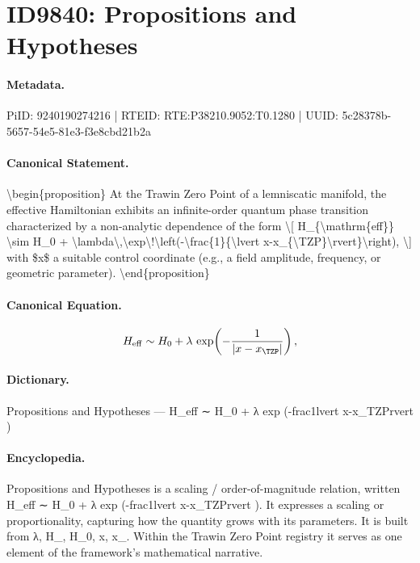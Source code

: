 \section*{ID9840: Propositions and Hypotheses}
\paragraph{Metadata.}
PiID: 9240190274216 | RTEID: RTE:P38210.9052:T0.1280 | UUID: 5c28378b-5657-54e5-81e3-f3e8cbd21b2a

\paragraph{Canonical Statement.}
\textbackslash{}begin\{proposition\} At the Trawin Zero Point of a lemniscatic manifold, the effective Hamiltonian exhibits an infinite-order quantum phase transition characterized by a non-analytic dependence of the form \textbackslash{}[ H\_\{\textbackslash{}mathrm\{eff\}\} \textbackslash{}sim H\_0 + \textbackslash{}lambda\textbackslash{},\textbackslash{}exp\textbackslash{}!\textbackslash{}left(-\textbackslash{}frac\{1\}\{\textbackslash{}lvert x-x\_\{\textbackslash{}TZP\}\textbackslash{}rvert\}\textbackslash{}right), \textbackslash{}] with \$x\$ a suitable control coordinate (e.g., a field amplitude, frequency, or geometric parameter). \textbackslash{}end\{proposition\}

\paragraph{Canonical Equation.}
\[
H_{\mathrm{eff}} \sim H_0 + \lambda\,\exp\!\left(-\frac{1}{\lvert x-x_{\TZP}\rvert}\right),
\]

\paragraph{Dictionary.}
Propositions and Hypotheses — H\_eff ∼ H\_0 + λ exp (-frac1lvert x-x\_TZPrvert )

\paragraph{Encyclopedia.}
Propositions and Hypotheses is a scaling / order-of-magnitude relation, written H\_eff ∼ H\_0 + λ exp (-frac1lvert x-x\_TZPrvert ). It expresses a scaling or proportionality, capturing how the quantity grows with its parameters. It is built from λ, H\_, H\_0, x, x\_. Within the Trawin Zero Point registry it serves as one element of the framework's mathematical narrative.
